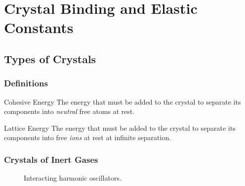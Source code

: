 \documentclass[hidelinks]{article}
\begin{document}
\section{Crystal Binding and Elastic Constants} %
\label{sec:crystal_binding_and_elastic_constants}

\subsection{Types of Crystals} %
\label{sub:types_of_crystals}

\subsubsection{Definitions} %
\label{ssub:definitions}

\begin{termdef}{Cohesive Energy}
    The energy that must be added to the crystal to separate its components into \emph{neutral} free atoms at rest.
\end{termdef}
\begin{termdef}{Lattice Energy}
    The energy that must be added to the crystal to separate its components into free \emph{ions} at rest at infinite separation.
\end{termdef}


\subsubsection{Crystals of Inert Gases} %
\label{ssub:crystals_of_inert_gases}

\begin{figure}[ht]
    \centering
    \caption{Interacting harmonic oscillators.}
    \label{fig:interacting_harmonic_oscillators}
\end{figure}
\end{document}
